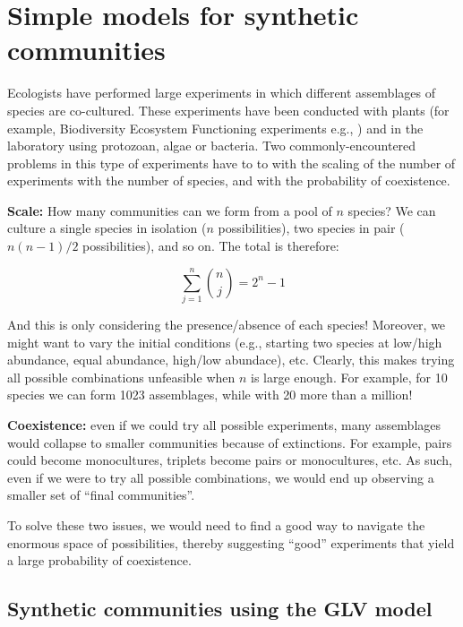 \documentclass[
]{book}
\begin{document}
\hypertarget{data}{%
\chapter{Simple models for synthetic communities}\label{data}}

Ecologists have performed large experiments in which different assemblages of species are co-cultured. These experiments have been conducted with plants (for example, Biodiversity Ecosystem Functioning experiments e.g., \citep{hector1999plant} \citep{tilman2001diversity} \citep{cadotte2013experimental}) and in the laboratory using protozoan, algae or bacteria. Two commonly-encountered problems in this type of experiments have to to with the scaling of the number of experiments with the number of species, and with the probability of coexistence.

\textbf{Scale:} How many communities can we form from a pool of \(n\) species? We can culture a single species in isolation (\(n\) possibilities), two species in pair (\(n(n-1) / 2\) possibilities), and so on. The total is therefore:

\[
\sum_{j=1}^n \binom{n}{j} = 2^n -1
\]

And this is only considering the presence/absence of each species! Moreover, we might want to vary the initial conditions (e.g., starting two species at low/high abundance, equal abundance, high/low abundace), etc. Clearly, this makes trying all possible combinations unfeasible when \(n\) is large enough. For example, for 10 species we can form 1023 assemblages, while with 20 more than a million!

\textbf{Coexistence:} even if we could try all possible experiments, many assemblages would collapse to smaller communities because of extinctions. For example, pairs could become monocultures, triplets become pairs or monocultures, etc. As such, even if we were to try all possible combinations, we would end up observing a smaller set of ``final communities''.

To solve these two issues, we would need to find a good way to navigate the enormous space of possibilities, thereby suggesting ``good'' experiments that yield a large probability of coexistence.

\hypertarget{synthetic-communities-using-the-glv-model}{%
\section{Synthetic communities using the GLV model}\label{synthetic-communities-using-the-glv-model}}
\end{document}

